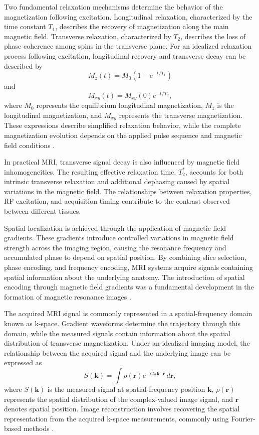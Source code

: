 Two fundamental relaxation mechanisms determine the behavior of the magnetization following excitation. Longitudinal relaxation, characterized by the time constant $T_1$, describes the recovery of magnetization along the main magnetic field. Transverse relaxation, characterized by $T_2$, describes the loss of phase coherence among spins in the transverse plane. For an idealized relaxation process following excitation, longitudinal recovery and transverse decay can be described by
\begin{equation}
M_z(t) = M_0\left(1-e^{-t/T_1}\right)
\end{equation}
and
\begin{equation}
M_{xy}(t) = M_{xy}(0)e^{-t/T_2},
\end{equation}
where $M_0$ represents the equilibrium longitudinal magnetization, $M_z$ is the longitudinal magnetization, and $M_{xy}$ represents the transverse magnetization. These expressions describe simplified relaxation behavior, while the complete magnetization evolution depends on the applied pulse sequence and magnetic field conditions \autocite{bloch1946nuclear,plewes2012physics}.

In practical MRI, transverse signal decay is also influenced by magnetic field inhomogeneities. The resulting effective relaxation time, $T_2^*$, accounts for both intrinsic transverse relaxation and additional dephasing caused by spatial variations in the magnetic field. The relationships between relaxation properties, RF excitation, and acquisition timing contribute to the contrast observed between different tissues.

Spatial localization is achieved through the application of magnetic field gradients. These gradients introduce controlled variations in magnetic field strength across the imaging region, causing the resonance frequency and accumulated phase to depend on spatial position. By combining slice selection, phase encoding, and frequency encoding, MRI systems acquire signals containing spatial information about the underlying anatomy. The introduction of spatial encoding through magnetic field gradients was a fundamental development in the formation of magnetic resonance images \autocite{lauterbur1973image}.

The acquired MRI signal is commonly represented in a spatial-frequency domain known as k-space. Gradient waveforms determine the trajectory through this domain, while the measured signals contain information about the spatial distribution of transverse magnetization. Under an idealized imaging model, the relationship between the acquired signal and the underlying image can be expressed as
\begin{equation}
S(\mathbf{k}) = \int \rho(\mathbf{r}) e^{-i2\pi\mathbf{k}\cdot\mathbf{r}}\,d\mathbf{r},
\end{equation}
where $S(\mathbf{k})$ is the measured signal at spatial-frequency position $\mathbf{k}$, $\rho(\mathbf{r})$ represents the spatial distribution of the complex-valued image signal, and $\mathbf{r}$ denotes spatial position. Image reconstruction involves recovering the spatial representation from the acquired k-space measurements, commonly using Fourier-based methods \autocite{tamir2025cookbook}.

